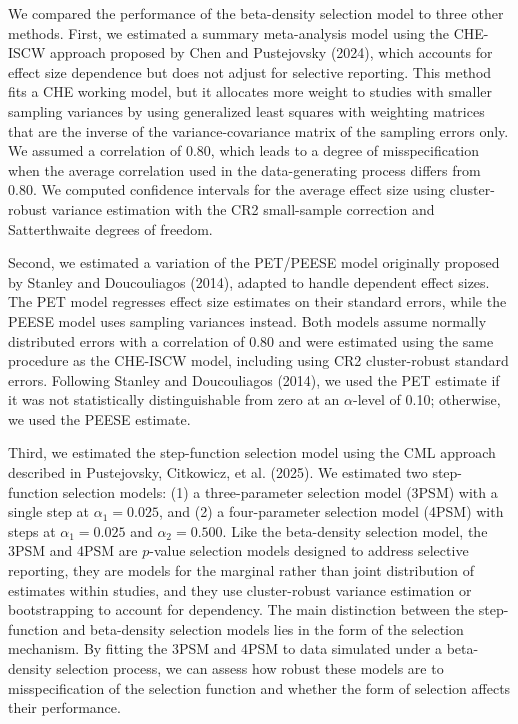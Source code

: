 \documentclass[
  american,
  man, donotrepeattitle,floatsintext]{apa7}
\begin{document}
We compared the performance of the beta-density selection model to three other methods. First, we estimated a summary meta-analysis model using the CHE-ISCW approach proposed by Chen and Pustejovsky (2024), which accounts for effect size dependence but does not adjust for selective reporting. This method fits a CHE working model, but it allocates more weight to studies with smaller sampling variances by using generalized least squares with weighting matrices that are the inverse of the variance-covariance matrix of the sampling errors only. We assumed a correlation of 0.80, which leads to a degree of misspecification when the average correlation used in the data-generating process differs from 0.80. We computed confidence intervals for the average effect size using cluster-robust variance estimation with the CR2 small-sample correction and Satterthwaite degrees of freedom.

Second, we estimated a variation of the PET/PEESE model originally proposed by Stanley and Doucouliagos (2014), adapted to handle dependent effect sizes. The PET model regresses effect size estimates on their standard errors, while the PEESE model uses sampling variances instead. Both models assume normally distributed errors with a correlation of 0.80 and were estimated using the same procedure as the CHE-ISCW model, including using CR2 cluster-robust standard errors. Following Stanley and Doucouliagos (2014), we used the PET estimate if it was not statistically distinguishable from zero at an \(\alpha\)-level of 0.10; otherwise, we used the PEESE estimate.

Third, we estimated the step-function selection model using the CML approach described in Pustejovsky, Citkowicz, et al. (2025).
We estimated two step-function selection models: (1) a three-parameter selection model (3PSM) with a single step at \(\alpha_1 = 0.025\), and (2) a four-parameter selection model (4PSM) with steps at \(\alpha_1 = 0.025\) and \(\alpha_2 = 0.500\).
Like the beta-density selection model, the 3PSM and 4PSM are \(p\)-value selection models designed to address selective reporting, they are models for the marginal rather than joint distribution of estimates within studies, and they use cluster-robust variance estimation or bootstrapping to account for dependency.
The main distinction between the step-function and beta-density selection models lies in the form of the selection mechanism. By fitting the 3PSM and 4PSM to data simulated under a beta-density selection process, we can assess how robust these models are to misspecification of the selection function and whether the form of selection affects their performance.
\end{document}
